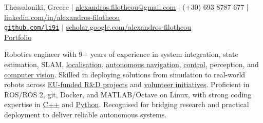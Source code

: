 \documentclass[a4paper,10pt,twoside]{article}
\begin{document}

\par{\bigskip\par}

\begin{center}
  {\footnotesize Thessaloniki, Greece $|$ \href{mailto:alexandros.filotheou@gmail.com}{alexandros.filotheou@gmail.com} $|$ (+30) 693 8787 677 $|$ \href{https://www.linkedin.com/in/alexandros-filotheou-5b6a8676/}{linkedin.com/in/alexandros-filotheou} \\ \href{https://github.com/li9i/}{\texttt{github.com/li9i}} $|$  \href{https://scholar.google.com/citations?hl=en&user=9_hI4hMAAAAJ&view_op=list_works}{scholar.google.com/alexandros-filotheou} \\ \href{https://mozilla.github.io/pdf.js/web/viewer.html?file=https://raw.githubusercontent.com/li9i/portfolio/master/portfolio.pdf}{Portfolio} \\}\vspace{1em}
\end{center}

\vspace{-3em}
\begin{bw_box} \small
  Robotics engineer with 9+ years of experience in system integration, state estimation, SLAM, \href{https://github.com/li9i/fsm-lo}{localisation}, \href{https://link.springer.com/article/10.1007/s10846-019-01086-y}{autonomous navigation}, \href{https://www.tandfonline.com/doi/full/10.1080/00207179.2018.1514129}{control}, perception, and \href{https://github.com/li9i/pandora\_vision\_2014}{computer vision}. Skilled in deploying solutions from simulation to real-world robots across \href{https://www.robetarme-project.eu/}{EU-funded R\&D projects} and \href{https://issel.ee.auth.gr/pandora-robotics/}{volunteer initiatives}. Proficient in ROS/ROS 2, git, Docker, and MATLAB/Octave on Linux, with strong coding expertise in \href{https://github.com/li9i/fsm}{C++} and \href{https://github.com/cultureid-auth-ros-packages/cultureid-waypoints-following}{Python}. Recognised for bridging research and practical deployment to deliver reliable autonomous systems.
\end{bw_box}
\end{document}
